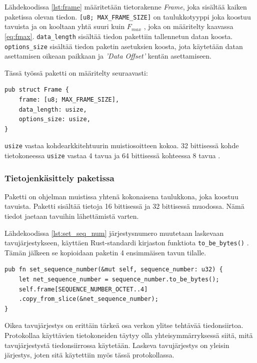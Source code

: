 \documentclass[a4paper,12pt]{article}
\begin{document}
    Lähdekoodissa \ref{lst:frame} määritetään tietorakenne \textit{Frame}, joka sisältää kaiken paketissa olevan tiedon.
    \lstinline{[u8; MAX_FRAME_SIZE]} on taulukkotyyppi joka koostuu tavuista ja on kooltaan yhtä suuri kuin $F_{max}$ , joka on määritelty kaavassa \ref{eq:fmax}.
    \lstinline{data_length} sisältää tiedon pakettiin tallennetun datan koosta. \lstinline{options_size} sisältää tiedon paketin asetuksien koosta, jota käytetään datan asettamisen oikeaan paikkaan ja \textit{'Data Offset'} kentän asettamiseen.
    
    Tässä työssä paketti on määritelty seuraavasti:
    \begin{lstlisting}[caption={Paketin rakenne}, label={lst:frame}]
pub struct Frame {
    frame: [u8; MAX_FRAME_SIZE],
    data_length: usize,
    options_size: usize,
}\end{lstlisting}


    
    \lstinline{usize} vastaa kohdearkkitehtuurin muistiosoitteen kokoa. 32 bittisessä kohde tietokoneessa \lstinline{usize} vastaa 4 tavua ja 64 bittisessä kohteessa 8 tavua \cite{rust-doc-usize}.
   
    \subsubsection{Tietojenkäsittely paketissa}
    Paketti on ohjelman muistissa yhtenä kokonaisena taulukkona, joka koostuu tavuista.
    Paketti sisältää tietoja 16 bittisessä ja 32 bittisessä muodossa. Nämä tiedot jaetaan tavuihin lähettämistä varten.

    Lähdekoodissa \ref{lst:set_seq_num} järjestysnumero muutetaan laskevaan tavujärjestykseen, käyttäen Rust-standardi kirjaston funktiota \lstinline{to_be_bytes()} \cite{rust_doc_u32}. Tämän jälkeen se kopioidaan paketin 4 ensimmäisen tavun tilalle. \par
    
        \begin{lstlisting}[caption={Järjestysnumeron asettaminen pakettiin}, label={lst:set_seq_num}]
pub fn set_sequence_number(&mut self, sequence_number: u32) {
    let net_sequence_number = sequence_number.to_be_bytes();
    self.frame[SEQUENCE_NUMBER_OCTET..4]
    .copy_from_slice(&net_sequence_number);
}\end{lstlisting}


    Oikea tavujärjestys on erittäin tärkeä osa verkon ylitse tehtävää tiedonsiirtoa. Protokollaa käyttävien tietokoneiden täytyy olla yhteisymmärryksessä siitä, mitä tavujärjestystä tiedonsiirrossa käytetään. Laskeva tavujärjestys on yleisin järjestys, joten sitä käytettiin myös tässä protokollassa. \par
    
\end{document}
